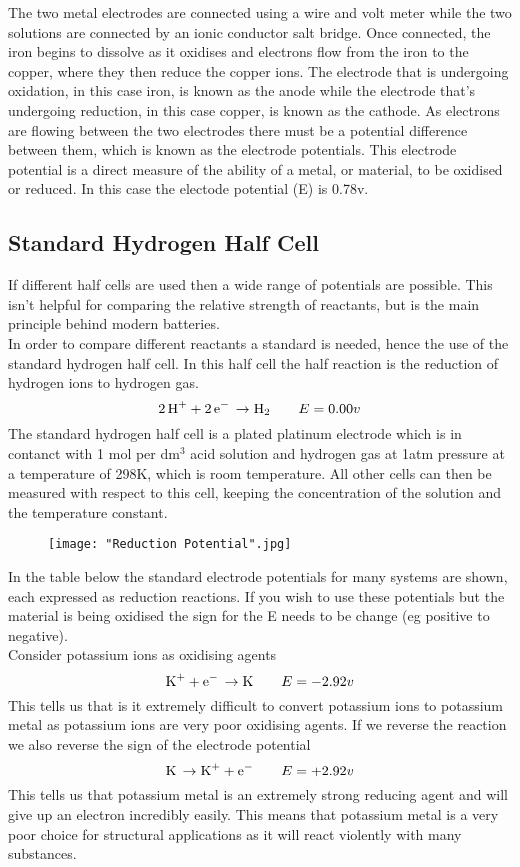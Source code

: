\documentclass[a4paper, 12pt]{article}
\begin{document}
		The two metal electrodes are connected using a wire and volt meter while the two solutions are connected by an ionic conductor salt bridge. Once connected, the iron begins to dissolve as it oxidises and electrons flow from the iron to the copper, where they then reduce the copper ions. The electrode that is undergoing oxidation, in this case iron, is known as the anode while the electrode that's undergoing reduction, in this case copper, is known as the cathode. As electrons are flowing between the two electrodes there must be a potential difference between them, which is known as the electrode potentials. This electrode potential is a direct measure of the ability of a metal, or material, to be oxidised or reduced. In this case the electode potential (E) is 0.78v.
		
	\subsection{Standard Hydrogen Half Cell}
		If different half cells are used then a wide range of potentials are possible. This isn't helpful for comparing the relative strength of reactants, but is the main principle behind modern batteries. \\
		In order to compare different reactants a standard is needed, hence the use of the standard hydrogen half cell. In this half cell the half reaction is the reduction of hydrogen ions to hydrogen gas.
		\[ \ce{2H+ + 2e- \rightarrow H2} \qquad E=0.00v \]
		The standard hydrogen half cell is a plated platinum electrode which is in contanct with 1 mol per dm$^{3}$ acid solution and hydrogen gas at 1atm pressure at a temperature of 298K, which is room temperature. All other cells can then be measured with respect to this cell, keeping the concentration of the solution and the temperature constant. \\
		\begin{figure}[!h]
			\texttt{[image: "Reduction Potential".jpg]}
		\end{figure}
		\par
		In the table below the standard electrode potentials for many systems are shown, each expressed as reduction reactions. If you wish to use these potentials but the material is being oxidised the sign for the E needs to be change (eg positive to negative). \\
		Consider potassium ions as oxidising agents
		\[ \ce{K+ + e- \rightarrow K} \qquad E = -2.92v \]
		This tells us that is it extremely difficult to convert potassium ions to potassium metal as potassium ions are very poor oxidising agents. If we reverse the reaction we also reverse the sign of the electrode potential
		\[ \ce{K \rightarrow K+ + e-} \qquad E=+2.92v \]
		This tells us that potassium metal is an extremely strong reducing agent and will give up an electron incredibly easily. This means that potassium metal is a very poor choice for structural applications as it will react violently with many substances. 
		
\end{document}
